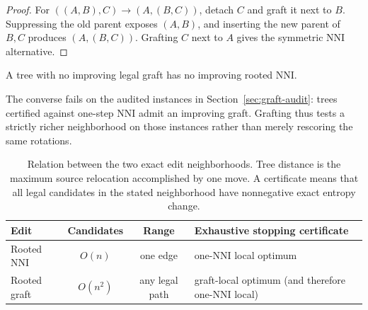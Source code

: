 \begin{proof}
For $((A,B),C)\rightarrow(A,(B,C))$, detach $C$ and graft it next to $B$.
Suppressing the old parent exposes $(A,B)$, and inserting the new parent of
$B,C$ produces $(A,(B,C))$. Grafting $C$ next to $A$ gives the symmetric NNI
alternative.
\end{proof}

\begin{corollary}\label{cor:graft-cert}
A tree with no improving legal graft has no improving rooted NNI.
\end{corollary}

The converse fails on the audited instances in Section~\ref{sec:graft-audit}:
trees certified against one-step NNI admit an improving graft. Grafting thus
tests a strictly richer neighborhood on those instances rather than merely
rescoring the same rotations.

\begin{table}[H]
\centering
\small
\caption{Relation between the two exact edit neighborhoods. Tree distance is
the maximum source relocation accomplished by one move. A certificate means
that all legal candidates in the stated neighborhood have nonnegative exact
entropy change.}
\label{tab:neighborhoods}
\begin{tabularx}{\textwidth}{@{}lccX@{}}
\toprule
Edit & Candidates & Range & Exhaustive stopping certificate \\
\midrule
Rooted NNI & $O(n)$ & one edge & one-NNI local optimum \\
Rooted graft & $O(n^2)$ & any legal path & graft-local optimum (and therefore one-NNI local) \\
\bottomrule
\end{tabularx}
\end{table}
